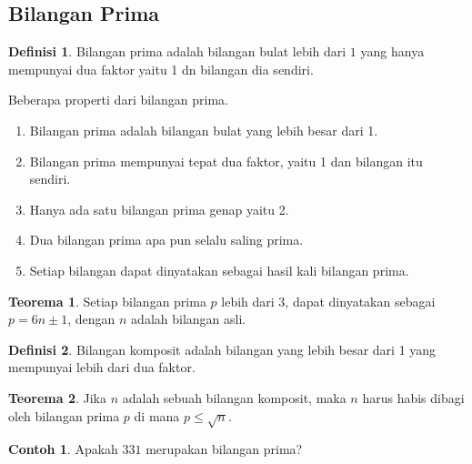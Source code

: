 \documentclass[aspectratio=169]{beamer}
\theoremstyle{definition}
\newtheorem{definisi}{Definisi}
\newtheorem{teorema}{Teorema}
\newtheorem{contoh}{Contoh}
\begin{document}
\subsection{Bilangan Prima}
\begin{frame}{\insertsection}{\insertsubsection}
  \begin{definisi}
    Bilangan prima adalah bilangan bulat lebih dari $1$ yang hanya mempunyai dua faktor yaitu 1 dn bilangan dia sendiri.
  \end{definisi}
  Beberapa properti dari bilangan prima.
  \begin{enumerate}
    \item Bilangan prima adalah bilangan bulat yang lebih besar dari 1.
    \item Bilangan prima mempunyai tepat dua faktor, yaitu 1 dan bilangan itu sendiri.
    \item Hanya ada satu bilangan prima genap yaitu 2.
    \item Dua bilangan prima apa pun selalu saling prima.
    \item Setiap bilangan dapat dinyatakan sebagai hasil kali bilangan prima.
  \end{enumerate}
\end{frame}
\begin{frame}{\insertsection}{\insertsubsection}
  \begin{teorema}
    Setiap bilangan prima $p$ lebih dari $3$, dapat dinyatakan sebagai $p=6n \pm 1$, dengan $n$ adalah bilangan asli.
  \end{teorema}
  \begin{definisi}
    Bilangan komposit adalah bilangan yang lebih besar dari 1 yang mempunyai lebih dari dua faktor.
  \end{definisi}
  \begin{teorema}
    Jika $n$ adalah sebuah bilangan komposit, maka $n$ harus habis dibagi oleh bilangan prima $p$ di mana $p \leq \sqrt{n}.$
  \end{teorema}
\end{frame}
\begin{frame}{\insertsection}{\insertsubsection}
  \begin{contoh}
    Apakah $331$ merupakan bilangan prima?
  \end{contoh}
\end{frame}
\end{document}
